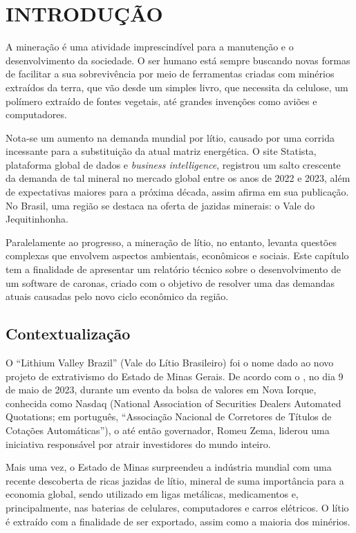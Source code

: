 \chapter{INTRODUÇÃO}

A mineração é uma atividade imprescindível para a manutenção e o desenvolvimento da sociedade. O ser humano está sempre buscando novas formas de facilitar a sua sobrevivência por meio de ferramentas criadas com minérios extraídos da terra, que vão desde um simples livro, que necessita da celulose, um polímero extraído de fontes vegetais, até grandes invenções como aviões e computadores.

Nota-se um aumento na demanda mundial por lítio, causado por uma corrida incessante para a substituição da atual matriz energética. O site Statista, plataforma global de dados e \textit{business intelligence}, registrou um salto crescente da demanda de tal mineral no mercado global entre os anos de 2022 e 2023, além de expectativas maiores para a próxima década, assim afirma  em sua publicação. No Brasil, uma região se destaca na oferta de jazidas minerais: o Vale do Jequitinhonha.

Paralelamente ao progresso, a mineração de lítio, no entanto, levanta questões complexas que envolvem aspectos ambientais, econômicos e sociais. Este capítulo tem a finalidade de apresentar um relatório técnico sobre o desenvolvimento de um software de caronas, criado com o objetivo de resolver uma das demandas atuais causadas pelo novo ciclo econômico da região.



\section{Contextualização}

O “Lithium Valley Brazil” (Vale do Lítio Brasileiro) foi o nome dado ao novo projeto de extrativismo do Estado de Minas Gerais. De acordo com o , no dia 9 de maio de 2023, durante um evento da bolsa de valores em Nova Iorque, conhecida como Nasdaq (National Association of Securities Dealers Automated Quotations; em português, ``Associação Nacional de Corretores de Títulos de Cotações Automáticas''), o até então governador, Romeu Zema, liderou uma iniciativa responsável por atrair investidores do mundo inteiro. 

Mais uma vez, o Estado de Minas surpreendeu a indústria mundial com uma recente descoberta de ricas jazidas de lítio, mineral de suma importância para a economia global, sendo utilizado em ligas metálicas, medicamentos e, principalmente, nas baterias de celulares, computadores e carros elétricos. O lítio é extraído com a finalidade de ser exportado, assim como a maioria dos minérios.

